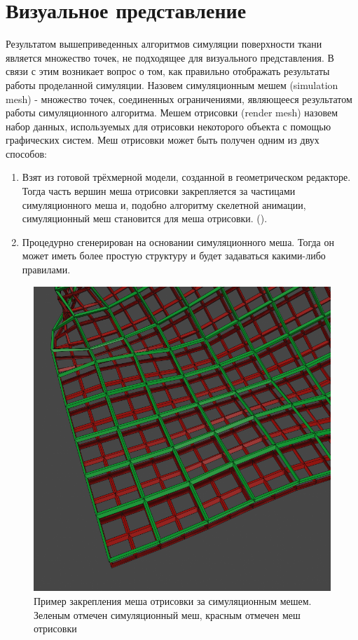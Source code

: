 \section{Визуальное представление} \label{ch3:rendering}
	Результатом вышеприведенных алгоритмов симуляции поверхности ткани является множество точек, не подходящее для визуального представления. В связи с этим возникает вопрос о том, как правильно отображать результаты работы проделанной симуляции. Назовем симуляционным мешем (simulation mesh) - множество точек, соединенных ограничениями, являющееся результатом работы симуляционного алгоритма. Мешем отрисовки (render mesh) назовем набор данных, используемых для отрисовки некоторого объекта с помощью графических систем. Меш отрисовки может быть получен одним из двух способов:
	\begin{enumerate}[1.]
		\item Взят из готовой трёхмерной модели, созданной в геометрическом редакторе. Тогда часть вершин меша отрисовки закрепляется за частицами симуляционного меша и, подобно алгоритму скелетной анимации, симуляционный меш становится  для меша отрисовки. ().
		\item Процедурно сгенерирован на основании симуляционного меша. Тогда он может иметь более простую структуру и будет задаваться какими-либо правилами.
	\end{enumerate}
	
	\begin{figure}[ht!] 
		\center
		\includegraphics [scale=0.5] {my_folder/images//simrendermesh}
		\caption{Пример закрепления меша отрисовки за симуляционным мешем. Зеленым отмечен симуляционный меш, красным отмечен меш отрисовки}
		\label{fig:meshSkinning}  
	\end{figure}
	
